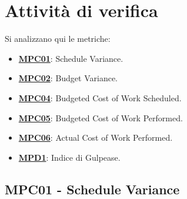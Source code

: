 \section{Attività di verifica}
Si analizzano qui le metriche:
\begin{itemize}
    \item \hyperref[s:mpc01]{\textbf{MPC01}}: Schedule Variance.
    \item \hyperref[s:mpc02]{\textbf{MPC02}}\textbf{}: Budget Variance.
    \item \hyperref[s:mpc04]{\textbf{MPC04}}\textbf{}: Budgeted Cost of Work Scheduled.
    \item \hyperref[s:mpc05]{\textbf{MPC05}}\textbf{}: Budgeted Cost of Work Performed.
    \item \hyperref[s:mpc06]{\textbf{MPC06}}\textbf{}: Actual Cost of Work Performed.
    \item \hyperref[s:mpd1]{\textbf{MPD1}}\textbf{}: Indice di Gulpease.
\end{itemize}

\subsection{MPC01 - Schedule Variance}
\label{s:mpc01}